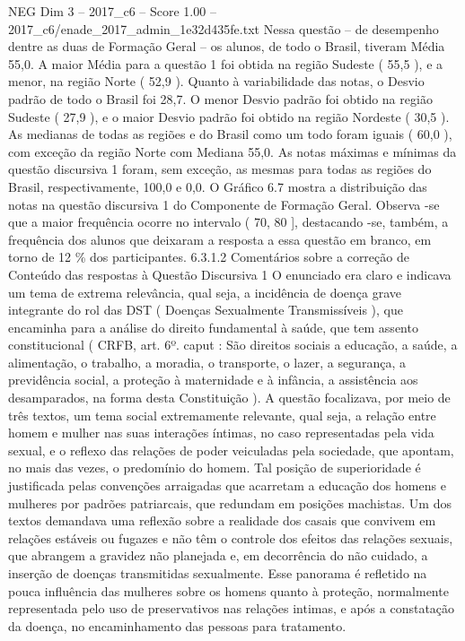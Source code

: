 \begin{textsample}{NEG Dim 3 – 2017\_c6 – Score 1.00 – 2017\_c6/enade\_2017\_admin\_1e32d435fe.txt}
Nessa questão – de desempenho dentre as duas de Formação Geral – os alunos, de todo o Brasil, tiveram Média 55,0.
A maior Média para a questão 1 foi obtida na região Sudeste ( 55,5 ), e a menor, na região Norte ( 52,9 ).
Quanto à variabilidade das notas, o Desvio padrão de todo o Brasil foi 28,7.
O menor Desvio padrão foi obtido na região Sudeste ( 27,9 ), e o maior Desvio padrão foi obtido na região Nordeste ( 30,5 ).
As medianas de todas as regiões e do Brasil como um todo foram iguais ( 60,0 ), com exceção da região Norte com Mediana 55,0.
As notas máximas e mínimas da questão discursiva 1 foram, sem exceção, as mesmas para todas as regiões do Brasil, respectivamente, 100,0 e 0,0.
O Gráfico 6.7 mostra a distribuição das notas na questão discursiva 1 do Componente de Formação Geral.
Observa -se que a maior frequência ocorre no intervalo ( 70, 80 ], destacando -se, também, a frequência dos alunos que deixaram a resposta a essa questão em branco, em torno de 12 \% dos participantes. 6.3.1.2 Comentários sobre a correção de Conteúdo das respostas à Questão Discursiva 1 O enunciado era claro e indicava um tema de extrema relevância, qual seja, a incidência de doença grave integrante do rol das DST ( Doenças Sexualmente Transmissíveis ), que encaminha para a análise do direito fundamental à saúde, que tem assento constitucional ( CRFB, art. 6º. caput : São direitos sociais a educação, a saúde, a alimentação, o trabalho, a moradia, o transporte, o lazer, a segurança, a previdência social, a proteção à maternidade e à infância, a assistência aos desamparados, na forma desta Constituição ).
A questão focalizava, por meio de três textos, um tema social extremamente relevante, qual seja, a relação entre homem e mulher nas suas interações íntimas, no caso representadas pela vida sexual, e o reflexo das relações de poder veiculadas pela sociedade, que apontam, no mais das vezes, o predomínio do homem.
Tal posição de superioridade é justificada pelas convenções arraigadas que acarretam a educação dos homens e mulheres por padrões patriarcais, que redundam em posições machistas.
Um dos textos demandava uma reflexão sobre a realidade dos casais que convivem em relações estáveis ou fugazes e não têm o controle dos efeitos das relações sexuais, que abrangem a gravidez não planejada e, em decorrência do não cuidado, a inserção de doenças transmitidas sexualmente.
Esse panorama é refletido na pouca influência das mulheres sobre os homens quanto à proteção, normalmente representada pelo uso de preservativos nas relações intimas, e após a constatação da doença, no encaminhamento das pessoas para tratamento.

\end{textsample}
